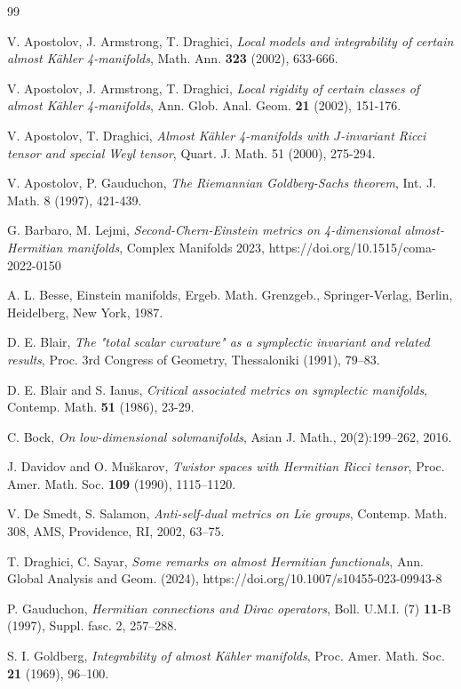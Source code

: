 \documentclass{amsart}
\newcommand{\ka}{K{\"a}hler }
\begin{document}
\begin{thebibliography}{99}

 V. Apostolov, J. Armstrong, T. Draghici, {\it Local
models and integrability of certain almost K\"ahler 4-manifolds},  Math. Ann. {\bf 323} (2002), 633-666.

 V. Apostolov, J. Armstrong, T. Draghici, {\it Local
rigidity of certain classes of almost K\"ahler 4-manifolds}, Ann. Glob. Anal. Geom. {\bf 21} (2002), 151-176.

 V. Apostolov, T. Draghici, {\it Almost K\"ahler 4-manifolds with $J$-invariant Ricci tensor and special Weyl tensor}, Quart. J. Math. 51 (2000), 275-294.

 V. Apostolov, P. Gauduchon, {\it The Riemannian Goldberg-Sachs theorem}, Int. J. Math. 8 (1997), 421-439.

 G. Barbaro, M. Lejmi, {\it Second-Chern-Einstein metrics on 4-dimensional almost-Hermitian manifolds}, Complex Manifolds 2023, https://doi.org/10.1515/coma-2022-0150

 A. L. Besse, Einstein manifolds, Ergeb. Math. Grenzgeb., Springer-Verlag, Berlin, Heidelberg, New York, 1987.

 D. E. Blair, {\it The "total scalar curvature" as a
symplectic invariant and related results}, Proc. 3rd Congress of Geometry, Thessaloniki (1991),
79--83.

 D. E. Blair and S. Ianus, {\it Critical associated metrics on
symplectic manifolds},
Contemp. Math. {\bf 51} (1986), 23-29.

 C. Bock, {\it On low-dimensional solvmanifolds}, Asian J. Math., 20(2):199--262, 2016.

 J. Davidov and O. Mu\u{s}karov, {\it Twistor spaces with Hermitian Ricci tensor}, Proc. Amer. Math. Soc. {\bf 109} (1990), 1115--1120.

 V. De Smedt, S. Salamon, {\it Anti-self-dual metrics on Lie groups}, Contemp. Math. 308, AMS, Providence, RI, 2002, 63–75.

 T. Draghici, C. Sayar, {\it Some remarks on almost Hermitian functionals}, Ann. Global Analysis and Geom. (2024), https://doi.org/10.1007/s10455-023-09943-8

 P. Gauduchon, {\it Hermitian connections and Dirac operators}, Boll. U.M.I. (7) {\bf 11}-B (1997), Suppl. fasc. 2,
257--288.

 S. I. Goldberg, {\it Integrability of almost \ka manifolds},
Proc. Amer. Math. Soc. {\bf 21} (1969), 96--100.


\end{thebibliography}
\end{document}
